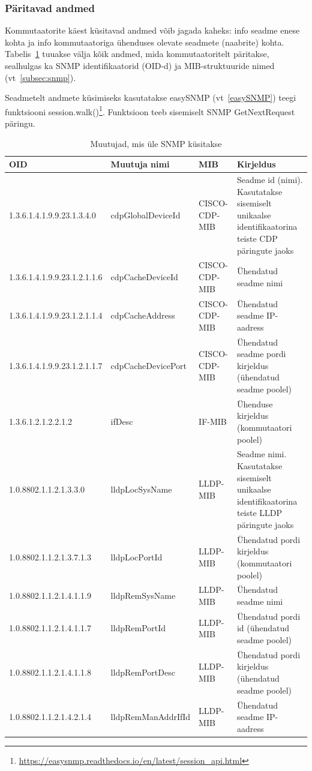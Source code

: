 \documentclass[12pt]{article}
\begin{document}
\subsubsection{Päritavad andmed} \label{dataAsked}
Kommutaatorite käest küsitavad andmed võib jagada kaheks: info seadme enese kohta ja info
kommutaatoriga ühenduses olevate seadmete (naabrite) kohta.
Tabelis~\ref{tab:oids} tuuakse välja kõik andmed, mida kommutaatoritelt päritakse, sealhulgas ka SNMP
identifikaatorid (OID-d) ja MIB-struktuuride nimed (vt~\ref{subsec:snmp}).

Seadmetelt andmete küsimiseks kasutatakse easySNMP (vt~\ref{easySNMP}) teegi funktsiooni
session.walk()\footnote{\url{https://easysnmp.readthedocs.io/en/latest/session\_api.html}}.
Funktsioon teeb sisemiselt SNMP GetNextRequest päringu.

\begin{table}[p]
\small
\centering
\caption{Muutujad, mis üle SNMP küsitakse}
    \begin{tabular}{| p{4cm} | p{3.2cm} | p{1.2cm} | p{4.3cm} |}
    \hline
        OID & Muutuja nimi & MIB & Kirjeldus \\
    \hline
        1.3.6.1.4.1.9.9.23.1.3.4.0 & cdpGlobalDeviceId & CISCO-CDP-MIB & Seadme id (nimi). Kasutatakse sisemiselt unikaalse identifikaatorina teiste CDP päringute jaoks \\
    \hline
        1.3.6.1.4.1.9.9.23.1.2.1.1.6 & cdpCacheDeviceId & CISCO-CDP-MIB & Ühendatud seadme nimi \\
    \hline
        1.3.6.1.4.1.9.9.23.1.2.1.1.4 & cdpCacheAddress & CISCO-CDP-MIB & Ühendatud seadme IP-aadress \\
    \hline
        1.3.6.1.4.1.9.9.23.1.2.1.1.7 & cdpCacheDevicePort & CISCO-CDP-MIB & Ühendatud seadme pordi kirjeldus (ühendatud seadme poolel) \\
    \hline
        1.3.6.1.2.1.2.2.1.2 & ifDesc & IF-MIB & Ühenduse kirjeldus (kommutaatori poolel) \\
    \hline
        1.0.8802.1.1.2.1.3.3.0 & lldpLocSysName & LLDP-MIB & Seadme nimi. Kasutatakse sisemiselt unikaalse identifikaatorina teiste LLDP päringute jaoks \\
    \hline
        1.0.8802.1.1.2.1.3.7.1.3 & lldpLocPortId & LLDP-MIB & Ühendatud pordi kirjeldus (kommutaatori poolel) \\
    \hline
        1.0.8802.1.1.2.1.4.1.1.9 & lldpRemSysName & LLDP-MIB & Ühendatud seadme nimi \\
    \hline
        1.0.8802.1.1.2.1.4.1.1.7 & lldpRemPortId & LLDP-MIB & Ühendatud pordi id (ühendatud seadme poolel) \\
    \hline
        1.0.8802.1.1.2.1.4.1.1.8 & lldpRemPortDesc & LLDP-MIB & Ühendatud pordi kirjeldus (ühendatud seadme poolel) \\
    \hline
        1.0.8802.1.1.2.1.4.2.1.4 & lldpRemManAddrIfId & LLDP-MIB & Ühendatud seadme IP-aadress \\
    \hline
\end{tabular}
\label{tab:oids}
\end{table}
\end{document}
